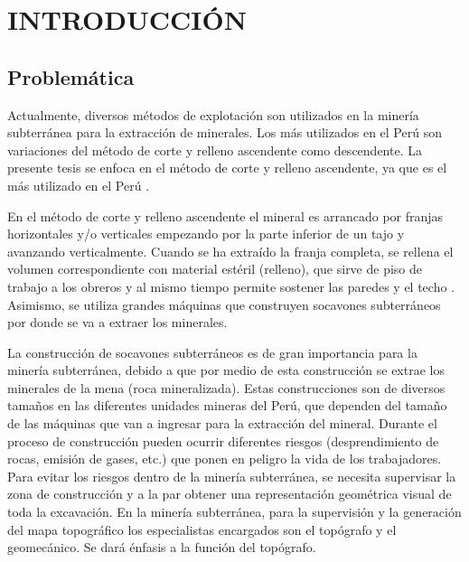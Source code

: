 \chapter{INTRODUCCIÓN}

\section{Problemática}

Actualmente, diversos métodos de explotación son utilizados en la minería subterránea para la extracción de minerales. Los más utilizados en el Perú son variaciones del método de corte y relleno ascendente como descendente. La presente tesis se enfoca en el método de corte y relleno ascendente, ya que es el más utilizado en el Perú \cite{Cruz2012}. 

En el método de corte y relleno ascendente el mineral es arrancado por franjas horizontales y/o verticales empezando por la parte inferior de un tajo y avanzando verticalmente. Cuando se ha extraído la franja completa, se rellena el volumen correspondiente con material estéril (relleno), que sirve de piso de trabajo a los obreros y al mismo tiempo permite sostener las paredes y el techo \cite{MunozDelPino2012}. Asimismo, se utiliza grandes máquinas que construyen socavones subterráneos por donde se va a extraer los minerales. 

La construcción de socavones subterráneos es de gran importancia para la minería subterránea, debido a que por medio de esta construcción se extrae los minerales de la mena (roca mineralizada). Estas construcciones son de diversos tamaños  en las diferentes unidades mineras del Perú, que dependen del tamaño de las máquinas que van a ingresar para la extracción del mineral. Durante el proceso de construcción pueden ocurrir diferentes riesgos (desprendimiento de rocas, emisión de gases, etc.) que ponen en peligro la vida de los trabajadores. Para evitar los riesgos dentro de la minería subterránea, se necesita supervisar la zona de construcción y a la par obtener una representación geométrica visual de toda la excavación. En la minería subterránea, para la supervisión y la generación del mapa topográfico los especialistas encargados son el topógrafo y el geomecánico. Se dará énfasis a la función del topógrafo. 

